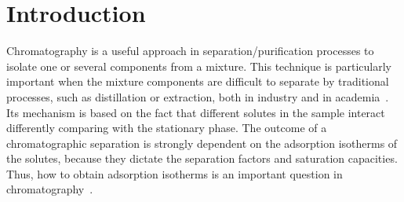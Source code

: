 \documentclass[thmsa,onecolumn,12pt]{article}%
\begin{document}
\section{Introduction}
\label{sec:Introduction}

Chromatography is a useful approach in separation/purification processes to isolate one or several components from a mixture. This technique is particularly important when the mixture components are difficult to separate by traditional processes, such as distillation or extraction, both in industry and in academia~\cite{GuiochonLin-03}. Its mechanism is based on the fact that different solutes in the sample interact differently comparing with the stationary phase. The outcome of a chromatographic separation is strongly dependent on the adsorption isotherms of the solutes, because they dictate the separation factors and saturation capacities. Thus, how to obtain adsorption isotherms is an important question in chromatography~\cite{ForssenArnell-06}.
\end{document}
